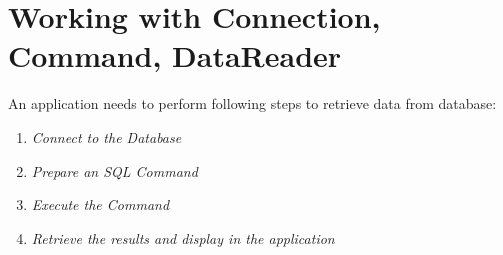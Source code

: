 %

\section{Working with Connection, Command, DataReader}
An application needs to perform following steps to retrieve data from database:
\begin{enumerate}
\item  \textit{Connect to the Database}
\item  \textit{Prepare an SQL Command}
\item  \textit{Execute the Command}
\item  \textit{Retrieve the results and display in the application}
\end{enumerate}

